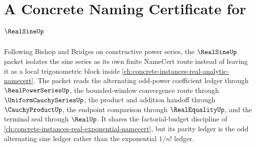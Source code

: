 \chapter{A Concrete Naming Certificate for $\RealSineUp$}
\label{ch:concrete-instances-real-sine-namecert}

Following Bishop and Bridges on constructive power series, the $\RealSineUp$ packet isolates the sine series as its own finite NameCert route instead of leaving it as a local trigonometric block inside \autoref{ch:concrete-instances-real-analytic-namecert}. The packet reads the alternating odd-power coefficient ledger through $\RealPowerSeriesUp$, the bounded-window convergence route through $\UniformCauchySeriesUp$, the product and addition handoff through $\CauchyProductUp$, the endpoint comparison through $\RealEqualityUp$, and the terminal seal through $\RealUp$. It shares the factorial-budget discipline of \autoref{ch:concrete-instances-real-exponential-namecert}, but its parity ledger is the odd alternating sine ledger rather than the exponential $1/n!$ ledger.

